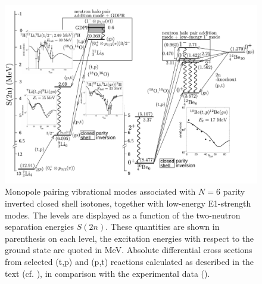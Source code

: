    \begin{figure}
   	\centerline{\includegraphics*[width=\textwidth,angle=0.3]{nutshell/figs/fig3_8_1}}
   	\caption{Monopole pairing vibrational modes associated with 
   		$N=6$ parity inverted closed shell isotones, together with low-energy E1-strength modes. 
   		The levels are  displayed as a function of the two-neutron separation energies $S(2n)$. 
   		These quantities are shown in parenthesis on each level, the excitation energies with respect to the ground state are quoted in MeV. 
   		Absolute differential cross sections from selected (t,p) and (p,t) reactions calculated as described in the text (cf. \cite{Potel:10,Potel:14}), 
   		in comparison with the experimental data (\cite{Young:71,Fortune:94}).}\label{fig3.8.1}
   \end{figure}
